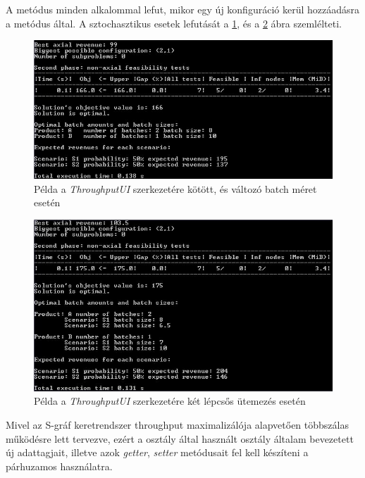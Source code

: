 A  metódus minden alkalommal lefut, mikor egy új konfiguráció kerül hozzáadásra a  metódus által.
A sztochasztikus esetek lefutását a \ref{ThroughputUIFixedVar}, és a \ref{ThroughputUITwoStage} ábra szemlélteti.
\begin{figure}[H]
\begin{center}
\includegraphics[scale=0.9]{throughputUIFixedVar}
\caption{Példa a \textit{ThroughputUI} szerkezetére kötött, és változó batch méret esetén}
\label{ThroughputUIFixedVar}
\end{center}
\end{figure}
\begin{figure}[H]
\begin{center}
\includegraphics[scale=0.9]{throughputUITwoStage}
\caption{Példa a \textit{ThroughputUI} szerkezetére két lépcsős ütemezés esetén}
\label{ThroughputUITwoStage}
\end{center}
\end{figure}
Mivel az S-gráf keretrendszer throughput maximalizálója alapvetően többszálas működésre lett tervezve, ezért a  osztály által használt  osztály általam bevezetett új adattagjait, illetve azok \textit{getter}, \textit{setter} metódusait fel kell készíteni a párhuzamos használatra.
